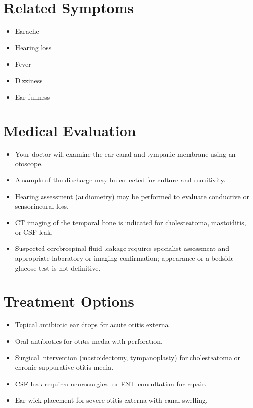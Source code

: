 \section*{Related Symptoms}
\begin{itemize}
  \item Earache
  \item Hearing loss
  \item Fever
  \item Dizziness
  \item Ear fullness
\end{itemize}

\section*{Medical Evaluation}
\begin{itemize}
  \item Your doctor will examine the ear canal and tympanic membrane using an otoscope.
  \item A sample of the discharge may be collected for culture and sensitivity.
  \item Hearing assessment (audiometry) may be performed to evaluate conductive or sensorineural loss.
  \item CT imaging of the temporal bone is indicated for cholesteatoma, mastoiditis, or CSF leak.
  \item Suspected cerebrospinal-fluid leakage requires specialist assessment and appropriate laboratory or imaging confirmation; appearance or a bedside glucose test is not definitive.
\end{itemize}

\section*{Treatment Options}
\begin{itemize}
  \item Topical antibiotic ear drops for acute otitis externa.
  \item Oral antibiotics for otitis media with perforation.
  \item Surgical intervention (mastoidectomy, tympanoplasty) for cholesteatoma or chronic suppurative otitis media.
  \item CSF leak requires neurosurgical or ENT consultation for repair.
  \item Ear wick placement for severe otitis externa with canal swelling.
\end{itemize}


